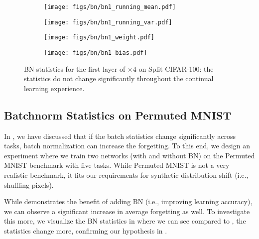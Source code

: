 \begin{figure*}[h]
\centering
\begin{subfigure}{.45\textwidth}
      \centering
      \texttt{[image: figs/bn/bn1\_running\_mean.pdf]}
      \caption{}
      \label{fig:cifar-bn1-running-mean}
\end{subfigure}\hfill
\begin{subfigure}{.45\textwidth}
      \centering
      \texttt{[image: figs/bn/bn1\_running\_var.pdf]}
      \caption{}
      \label{fig:cifar-bn1-running-var}
\end{subfigure}\hfill
\begin{subfigure}{.45\textwidth}
      \centering
      \texttt{[image: figs/bn/bn1\_weight.pdf]}
      \caption{}
      \label{fig:cifar-bn1-weights}
\end{subfigure}\hfill
\begin{subfigure}{.45\textwidth}
      \centering
      \texttt{[image: figs/bn/bn1\_bias.pdf]}
      \caption{}
      \label{fig:cifar-bn1-bias}
\end{subfigure}
\caption{BN statistics for the first layer of \CNN$\times 4$ on Split CIFAR-100: the statistics do not change significantly throughout the continual learning experience.}
\label{fig:cifar-bn1}
\end{figure*}

\subsection{Batchnorm Statistics on Permuted MNIST}
\label{sec:appendix-bn-mnist}
In , we have discussed that if the batch statistics change significantly across tasks, batch normalization can increase the forgetting. To this end, we design an experiment where we train two  networks (with and without BN) on the Permuted MNIST benchmark\citep{DBLP:journals/corr/GoodfellowMDCB13} with five tasks. While Permuted MNIST is not a very realistic benchmark, it fits our requirements for synthetic distribution shift (i.e., shuffling pixels). 

While  demonstrates the benefit of adding BN (i.e., improving learning accuracy), we can observe a significant increase in average forgetting as well. To investigate this more, we visualize the BN statistics in  where we can see compared to , the statistics change more, confirming our hypothesis in . 


